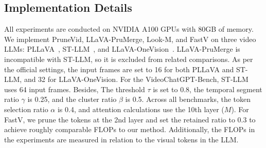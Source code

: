 \documentclass{article} %
\begin{document}
\subsection{Implementation Details}
All experiments are conducted on NVIDIA A100 GPUs with 80GB of memory. We implement PruneVid, LLaVA-PruMerge, Look-M, and FastV on three video LLMs: PLLaVA~\citep{pllava}, ST-LLM~\citep{tarsier}, and LLaVA-OneVision~\citep{llava-onevision}. LLaVA-PruMerge is incompatible with ST-LLM, so it is excluded from related comparisons. As per the official settings, the input frames are set to 16 for both PLLaVA and ST-LLM, and 32 for LLaVA-OneVision. For the VideoChatGPT-Bench, ST-LLM uses 64 input frames. Besides, The threshold $\tau$ is set to 0.8, the temporal segment ratio $\gamma$ is 0.25, and the cluster ratio $\beta$ is 0.5. Across all benchmarks, the token selection ratio $\alpha$ is 0.4, and attention calculations use the 10th layer ($M$). For FastV, we prune the tokens at the 2nd layer and set the retained ratio to 0.3 to achieve roughly comparable FLOPs to our method. Additionally, the FLOPs in the experiments are measured in relation to the visual tokens in the LLM.

\end{document}
